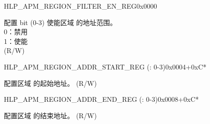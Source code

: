 \begin{register}{H}{LP\_APM\_REGION\_FILTER\_EN\_REG}{0x0000}\label{regdesc:LPAPMREGIONFILTERENREG}
%
%
\regnewline%
\begin{regdesc}\begin{reglist}
\label{fielddesc:LPAPMREGIONFILTEREN}\item [LP\_APM\_REGION\_FILTER\_EN] 配置 bit (0-3) 使能区域  的地址范围。\\ 
0：禁用 \\ 
1：使能  \\ (R/W)
\end{reglist}\end{regdesc}
\end{register}


\begin{register}{H}{LP\_APM\_REGION\_ADDR\_START\_REG (: 0-3)}{0x0004+0xC*}\label{regdesc:LPAPMREGION0ADDRSTARTREG}
%
\regnewline%
\begin{regdesc}\begin{reglist}
\label{fielddesc:LPAPMREGION0ADDRSTART}\item [LP\_APM\_REGION\regindex{n}\_ADDR\_START] 配置区域  的起始地址。 (R/W)
\end{reglist}\end{regdesc}
\end{register}


\begin{register}{H}{LP\_APM\_REGION\_ADDR\_END\_REG (: 0-3)}{0x0008+0xC*} \label{regdesc:LPAPMREGION0ADDRENDREG}
%
\regnewline%
\begin{regdesc}\begin{reglist}
\label{fielddesc:LPAPMREGION0ADDREND}\item [LP\_APM\_REGION\regindex{n}\_ADDR\_END] 配置区域  的结束地址。 (R/W)
\end{reglist}\end{regdesc}
\end{register}
















